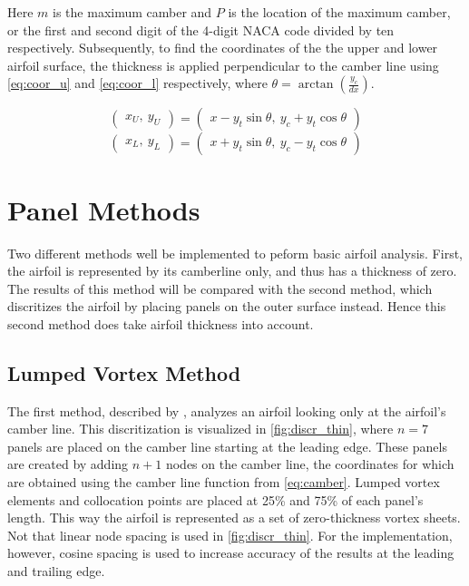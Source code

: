 Here $m$ is the maximum camber and $P$ is the location of the maximum camber, or
the first and second digit of the 4-digit NACA code divided by ten respectively.
Subsequently, to find the coordinates of the the upper and lower airfoil
surface, the thickness is applied perpendicular to the camber line using
\autoref{eq:coor_u} and \autoref{eq:coor_l} respectively, where $\theta =
\arctan\left( \frac{y_c}{dx}\right)$.

\begin{equation}
\label{eq:coor_u}
    \left(\begin{array}{l} x_U, \: y_U\end{array}\right) =
    \left(\begin{array}{l} x-y_t \sin \theta, \: y_c+y_t\cos \theta\end{array}\right)
\end{equation}
\begin{equation}
\label{eq:coor_l}
    \left(\begin{array}{l} x_L, \:  y_L\end{array}\right) =
    \left(\begin{array}{l} x+y_t \sin \theta, \: y_c-y_ t \cos \theta\end{array}\right)
\end{equation}

\chapter{Panel Methods}  %
Two different methods well be implemented to peform basic airfoil analysis.
First, the airfoil is represented by its camberline only, and thus has a
thickness of zero. The results of this method will be compared with the second
method, which discritizes the airfoil by placing panels on the outer surface
instead. Hence this second method does take airfoil thickness into account.

\section{Lumped Vortex Method}
\label{sec:thin}
The first method, described by \citeauthor{katz_plotkin}\cite{katz_plotkin}, analyzes an airfoil
looking only at the airfoil's camber line. This discritization is visualized in
\autoref{fig:discr_thin}, where $n=7$ panels are placed on the camber line starting at
the leading edge. These panels are created by adding $n+1$ nodes on the camber
line, the coordinates for which are obtained using the camber line function from
\autoref{eq:camber}. Lumped vortex elements and collocation points are placed at
25\% and 75\% of each panel's length. This way the airfoil is represented as a
set of zero-thickness vortex sheets. Not that linear node spacing is used in
\autoref{fig:discr_thin}. For the implementation, however, cosine spacing is used to
increase accuracy of the results at the leading and trailing edge.


